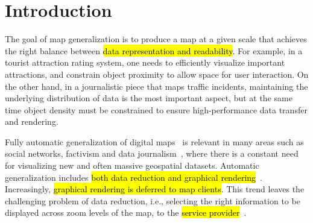 \section{Introduction}






The goal of map generalization is to produce a map at a given scale that achieves the right balance between \hl{data representation and readability}. For example, in a tourist attraction rating system, one needs to efficiently visualize important attractions, and constrain object proximity to allow space for user interaction. On the other hand, in a journalistic piece that maps traffic incidents, maintaining the underlying distribution of data is the most important aspect, but at the same time object density must be constrained to ensure high-performance data transfer and rendering.


Fully automatic generalization of digital maps~\cite{sarma2012fusiontables,nutanong2012multiresolution} is relevant in many areas such as social networks, factivism and data journalism~\cite{cohen2011journalism,bono,sankaranarayanan2009twitterstand}, where there is a constant need for visualizing new and often massive geospatial datasets. Automatic generalization includes \hl{both data reduction and graphical rendering}~\cite{gruenreich1985cag}. Increasingly, \hl{graphical rendering is deferred to map clients}. This trend leaves the challenging problem of data reduction, i.e., selecting the right information to be displayed across zoom levels of the map, to the \hl{service provider}~\cite{gaffuri12vectortiles}. 

